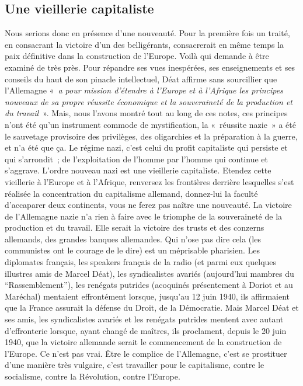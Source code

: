 \documentclass[french,twoside]{book} %
\begin{document}
\subsection[Une vieillerie capitaliste]{Une vieillerie capitaliste}
\noindent Nous serions donc en présence d’une nouveauté. Pour la première fois un traité, en consacrant la victoire d’un des belligérants, consacrerait en même temps la paix définitive dans la construction de l’Europe. Voilà qui demande à être examiné de très près. Pour répandre ses vues inespérées, ses enseignements et ses conseils du haut de son pinacle intellectuel, Déat affirme sans sourcillier que l’Allemagne « \emph{a pour mission d’étendre à l’Europe et à l’Afrique les principes nouveaux de sa propre réussite économique et la souveraineté de la production et du travail} ». Mais, nous l’avons montré tout au long de ces notes, ces principes n’ont été qu’un instrument commode de mystification, la « réussite nazie » a été le sauvetage provisoire des privilèges, des oligarchies et la préparation à la guerre, et n’a été que ça. Le régime nazi, c’est celui du profit capitaliste qui persiste et qui s’arrondit ; de l’exploitation de l’homme par l’homme qui continue et s’aggrave. L’ordre nouveau nazi est une vieillerie capitaliste. Etendez cette vieillerie à l’Europe et à l’Afrique, renversez les frontières derrière lesquelles s’est réalisée la concentration du capitalisme allemand, donnez-lui la faculté d’accaparer deux continents, vous ne ferez pas naître une nouveauté. La victoire de l’Allemagne nazie n’a rien à faire avec le triomphe de la souveraineté de la production et du travail. Elle serait la victoire des trusts et des conzerns allemands, des grandes banques allemandes. Qui n’ose pas dire cela (les communistes ont le courage de le dire) est un méprisable pharisien. Les diplomates français, les speakers français de la radio (et parmi eux quelques illustres amis de Marcel Déat), les syndicalistes avariés (aujourd’hui mambres du “Rassemblement”), les renégats putrides (acoquinés présentement à Doriot et au Maréchal) mentaient effrontément lorsque, jusqu’au 12 juin 1940, ils affirmaient que la France assurait la défense du Droit, de la Démocratie. Mais Marcel Déat et ses amis, les syndicalistes avariés et les renégats putrides mentent avec autant d’effronterie lorsque, ayant changé de maîtres, ils proclament, depuis le 20 juin 1940, que la victoire allemande serait le commencement de la construction de l’Europe. Ce n’est pas vrai. Être le complice de l’Allemagne, c’est se prostituer d’une manière très vulgaire, c’est travailler pour le capitalisme, contre le socialisme, contre la Révolution, contre l’Europe.
\end{document}
